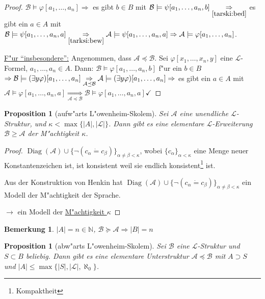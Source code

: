 \documentclass[a4paper,12pt,numbers=noenddot,parskip=full]{scrartcl}
\newcommand{\setN}{\mathbb{N}}
\newcommand{\scrL}{\mathcal{L}}
\newcommand{\scrA}{\mathcal{A}}
\newcommand{\scrB}{\mathcal{B}}
\DeclareMathOperator{\Diag}{Diag}
\newcommand{\vdig}{\Diag}
\theoremstyle{dotless}
\newtheorem{proposition}[theorem]{Proposition}
\newtheorem{remark}[theorem]{Bemerkung}
\begin{document}
\begin{proof}
	$\scrB \models \varphi[a_1, \dots, a_n] \Rightarrow$ es gibt $b \in B$ mit $\scrB \models \psi[a_1, \dots, a_n, b] \underset{\ref{tarski:bed}}{\Rightarrow}$ es gibt ein $a \in A$ mit $\scrB \models \psi[a_1, \dots, a_n, a] \underset{\ref{tarksi:bew}}{\Rightarrow} \scrA \models \psi[a_1, \dots, a_n, a] \Rightarrow \scrA \models \varphi[a_1, \dots, a_n]$.
	
	\underline{F"ur "`insbesondere"':} Angenommen, dass $\scrA \preceq \scrB$. Sei $\varphi[x_1, \dots, x_n, y]$ eine $\scrL$-Formel, $a_1, \dots, a_n \in A$. Dann: $\scrB \models \varphi[a_1, \dots, a_n, b]$ f"ur ein $b \in B$ $\Rightarrow \scrB \models (\exists y \varphi)[a_1, \dots, a_n] \\
	\underset{\scrA \preceq \scrB}{\Rightarrow} \scrA \models (\exists y \varphi)[a_1, \dots, a_n] \Rightarrow$ es gibt ein $a \in A$ mit $\scrA \models \varphi[a_1, \dots, a_n, a] {\underset{\scrA \preceq \scrB}{\Rightarrow} \scrB \models \varphi[a_1, \dots, a_n, a]} \checkmark$
\end{proof}

\begin{proposition}[aufw"arts L"owenheim-Skolem]\label{ls:auf}
	Sei $\scrA$ eine unendliche $\scrL$-Struktur, und $\kappa < \max\{|A|,|\scrL|\}$. Dann gibt es eine elementare $\scrL$-Erweiterung $\scrB \geq \scrA$ der M"achtigkeit $\kappa$.
\end{proposition}
\begin{proof}
	$\vdig(\scrA) \cup \{\lnot(c_\alpha \dot= c_\beta)\}_{\alpha \neq \beta < \kappa}$, wobei $\{c_\alpha\}_{\alpha<\kappa}$ eine Menge neuer Konstantenzeichen ist, ist konsistent weil sie endlich konsistent\footnote{Kompaktheit} ist.
	
	Aus der Konstruktion von Henkin hat $\vdig(\scrA) \cup \{\lnot(c_\alpha \dot= c_\beta)\}_{\alpha \neq \beta < \kappa}$ ein Modell der M"achtigkeit der Sprache.
	
	$\rightarrow$ ein Modell der \underline{M"achtigkeit $\kappa$}
\end{proof}

\begin{remark}
	$|A| = n \in \setN$, $\scrB \succeq \scrA \Rightarrow |B| = n$
\end{remark}

\begin{proposition}[abw"arts L"owenheim-Skolem]\label{ls:ab}
	Sei $\scrB$ eine $\scrL$-Struktur und $S \subset B$ beliebig. Dann gibt es eine elementare Unterstruktur $\scrA \preceq \scrB$ mit $A \supset S$ und $|A|\leq \max\{|S|,|\scrL|,\aleph_0\}$.
\end{proposition}
\end{document}
